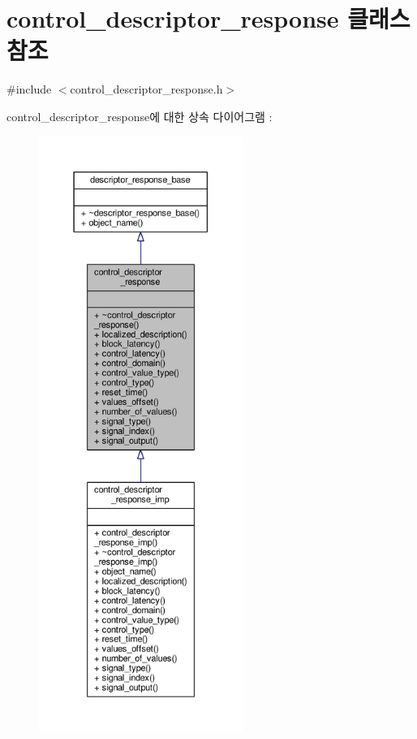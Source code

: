 \hypertarget{classavdecc__lib_1_1control__descriptor__response}{}\section{control\+\_\+descriptor\+\_\+response 클래스 참조}
\label{classavdecc__lib_1_1control__descriptor__response}


{\ttfamily \#include $<$control\+\_\+descriptor\+\_\+response.\+h$>$}



control\+\_\+descriptor\+\_\+response에 대한 상속 다이어그램 \+: 
\nopagebreak
\begin{figure}[H]
\begin{center}
\leavevmode
\includegraphics[height=550pt]{classavdecc__lib_1_1control__descriptor__response__inherit__graph}
\end{center}
\end{figure}


